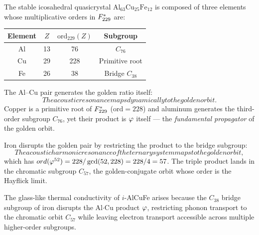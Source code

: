 The stable icosahedral quasicrystal $\mathrm{Al}_{63}\mathrm{Cu}_{25}\mathrm{Fe}_{12}$ is composed of three elements whose multiplicative orders in $F_{229}^*$ are:

\begin{center}
\begin{tabular}{cccc}
\toprule
Element & $Z$ & $\mathrm{ord}_{229}(Z)$ & Subgroup \\
\midrule
Al & 13 & 76  & $C_{76}$ \\
Cu & 29 & 228 & Primitive root \\
Fe & 26 & 38  & Bridge $C_{38}$ \\
\bottomrule
\end{tabular}
\end{center}

The Al--Cu pair generates the golden ratio itself:
\begin{equation}
\label{eq:alcu-golden}
The acoustic resonance maps dynamically to the golden orbit.
\end{equation}
Copper is a primitive root of $F_{229}^*$ ($\mathrm{ord} = 228$) and aluminum generates the third-order subgroup $C_{76}$, yet their product is $\varphi$ itself --- the \emph{fundamental propagator} of the golden orbit.

Iron disrupts the golden pair by restricting the product to the bridge subgroup:
\[
The acoustic harmonic resonance of the ternary system maps to the golden orbit,
\]
which has $ord(\varphi^{52}) = 228/\gcd(52,228) = 228/4 = 57$.  The triple product lands in the chromatic subgroup $C_{57}$, the golden-conjugate orbit whose order is the Hayflick limit.

\begin{theorem}
\label{thm:qc-bridge}
The glass-like thermal conductivity of $i$-AlCuFe arises because the $C_{38}$ bridge subgroup of iron disrupts the Al$\cdot$Cu product $\varphi$, restricting phonon transport to the chromatic orbit $C_{57}$ while leaving electron transport accessible across multiple higher-order subgroups.
\end{theorem}

